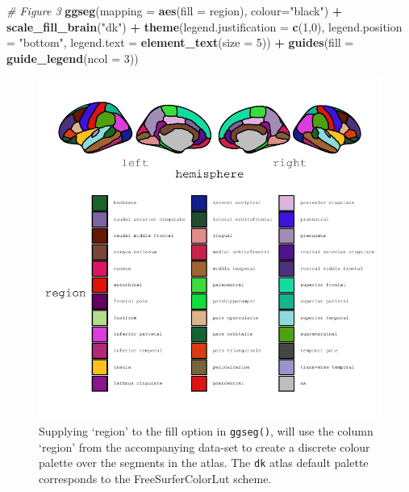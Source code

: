 \documentclass[fleqn,10pt]{wlpeerj} %
\newenvironment{Shaded}{\begin{snugshade}}{\end{snugshade}}
\newcommand{\CommentTok}[1]{\textcolor[rgb]{0.56,0.35,0.01}{\textit{#1}}}
\newcommand{\DataTypeTok}[1]{\textcolor[rgb]{0.13,0.29,0.53}{#1}}
\newcommand{\DecValTok}[1]{\textcolor[rgb]{0.00,0.00,0.81}{#1}}
\newcommand{\KeywordTok}[1]{\textcolor[rgb]{0.13,0.29,0.53}{\textbf{#1}}}
\newcommand{\NormalTok}[1]{#1}
\newcommand{\OperatorTok}[1]{\textcolor[rgb]{0.81,0.36,0.00}{\textbf{#1}}}
\newcommand{\StringTok}[1]{\textcolor[rgb]{0.31,0.60,0.02}{#1}}
\begin{document}
\begin{Shaded}
\begin{Highlighting}[]
\CommentTok{# Figure 3}
\KeywordTok{ggseg}\NormalTok{(}\DataTypeTok{mapping =} \KeywordTok{aes}\NormalTok{(}\DataTypeTok{fill =}\NormalTok{ region), }\DataTypeTok{colour=}\StringTok{"black"}\NormalTok{) }\OperatorTok{+}
\StringTok{  }\KeywordTok{scale_fill_brain}\NormalTok{(}\StringTok{"dk"}\NormalTok{) }\OperatorTok{+}
\StringTok{  }\KeywordTok{theme}\NormalTok{(}\DataTypeTok{legend.justification =} \KeywordTok{c}\NormalTok{(}\DecValTok{1}\NormalTok{,}\DecValTok{0}\NormalTok{),}
        \DataTypeTok{legend.position =} \StringTok{"bottom"}\NormalTok{,}
        \DataTypeTok{legend.text =} \KeywordTok{element_text}\NormalTok{(}\DataTypeTok{size =} \DecValTok{5}\NormalTok{)) }\OperatorTok{+}
\StringTok{  }\KeywordTok{guides}\NormalTok{(}\DataTypeTok{fill =} \KeywordTok{guide_legend}\NormalTok{(}\DataTypeTok{ncol =} \DecValTok{3}\NormalTok{))}
\end{Highlighting}
\end{Shaded}

\begin{figure}
\centering
\includegraphics{msc_ggseg_files/figure-latex/figure3-1.pdf}
\caption{\label{fig:figure3}Supplying `region' to the fill option in \texttt{ggseg()}, will use the column `region' from the accompanying data-set to create a discrete colour palette over the segments in the atlas. The \texttt{dk} atlas default palette corresponds to the FreeSurferColorLut scheme.}
\end{figure}
\end{document}
